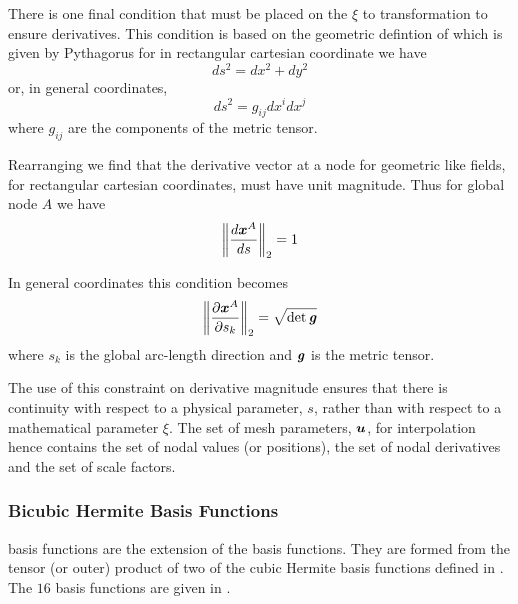 There is one final condition that must be placed on the $\xi$ to \arclen
transformation to ensure \arclen derivatives. This condition is based on the
geometric defintion of \arclen which is given by Pythagorus \ie for \twods in
rectangular cartesian coordinate we have
\begin{equation}
  ds^{2}=dx^{2}+dy^{2}
  \label{eqn:arclengthpythagorus}
\end{equation}
or, in general coordinates,
\begin{equation}
  ds^{2}=g_{ij}dx^{i}dx^{j}
  \label{eqn:genarclengthpythagorus}
\end{equation}
where $g_{ij}$ are the components of the metric tensor.

Rearranging  we find that the \arclen derivative vector at a
node for geometric like fields, for rectangular cartesian coordinates, must
have unit magnitude. Thus for global node $A$ we have
\begin{equation}
  \norm{\dby{\nodept{\vect{x}}{A}}{s}}=1
  \label{eqn:chnormconstraint}
\end{equation}

In general coordinates this condition becomes
\begin{equation}
  \norm{\delby{\nodept{\vect{x}}{A}}{s_{k}}}=\sqrt{\det{\tensor{g}}}
  \label{eqn:genchnormconstraint}
\end{equation}
where $s_{k}$ is the  global arc-length direction and $\boldsymbol{\mathit{g}}$ is the metric tensor.

The use of this constraint on \arclen derivative magnitude ensures that there is continuity with respect to a physical parameter,
$s$, rather than with respect to a mathematical parameter $\xi$. The set of
mesh parameters, $\vect{u}$, for \cubicherm interpolation hence contains the
set of nodal values (or positions), the set of nodal \arclen derivatives and
the set of scale factors.

\subsubsection{Bicubic Hermite Basis Functions}

\Bicubicherm basis functions are the \twodal extension of the \onedal
\cubicherm basis functions. They are formed from the tensor (or outer) product
of two of the \onedal cubic Hermite basis functions defined in
. The $16$ \bicubicherm basis functions are given in .

